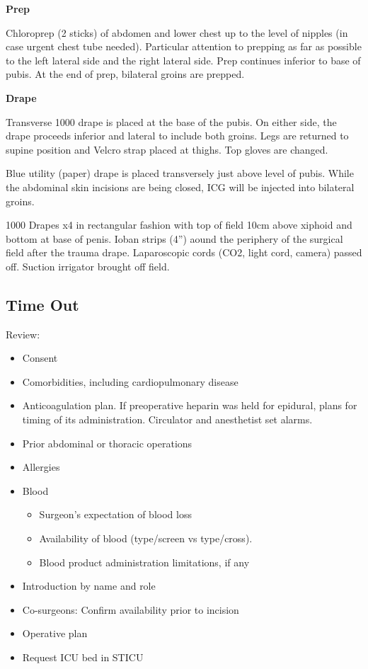 \documentclass[
  letterpaper,
]{scrbook}
\providecommand{\tightlist}{%
  \setlength{\itemsep}{0pt}\setlength{\parskip}{0pt}}
\begin{document}
\textbf{Prep}

Chloroprep (2 sticks) of abdomen and lower chest up to the level of
nipples (in case urgent chest tube needed). Particular attention to
prepping as far as possible to the left lateral side and the right
lateral side. Prep continues inferior to base of pubis. At the end of
prep, bilateral groins are prepped.

\textbf{Drape}

Transverse 1000 drape is placed at the base of the pubis. On either
side, the drape proceeds inferior and lateral to include both groins.
Legs are returned to supine position and Velcro strap placed at thighs.
Top gloves are changed.

Blue utility (paper) drape is placed transversely just above level of
pubis. While the abdominal skin incisions are being closed, ICG will be
injected into bilateral groins.

1000 Drapes x4 in rectangular fashion with top of field 10cm above
xiphoid and bottom at base of penis. Ioban strips (4'') aound the
periphery of the surgical field after the trauma drape. Laparoscopic
cords (CO2, light cord, camera) passed off. Suction irrigator brought
off field.

\subsection{Time Out}\label{time-out-2}

Review:

\begin{itemize}
\tightlist
\item
  Consent
\item
  Comorbidities, including cardiopulmonary disease
\item
  Anticoagulation plan. If preoperative heparin was held for epidural,
  plans for timing of its administration. Circulator and anesthetist set
  alarms.
\item
  Prior abdominal or thoracic operations
\item
  Allergies
\item
  Blood

  \begin{itemize}
  \tightlist
  \item
    Surgeon's expectation of blood loss
  \item
    Availability of blood (type/screen vs type/cross).
  \item
    Blood product administration limitations, if any
  \end{itemize}
\item
  Introduction by name and role
\item
  Co-surgeons: Confirm availability prior to incision
\item
  Operative plan
\item
  Request ICU bed in STICU
\end{itemize}
\end{document}
